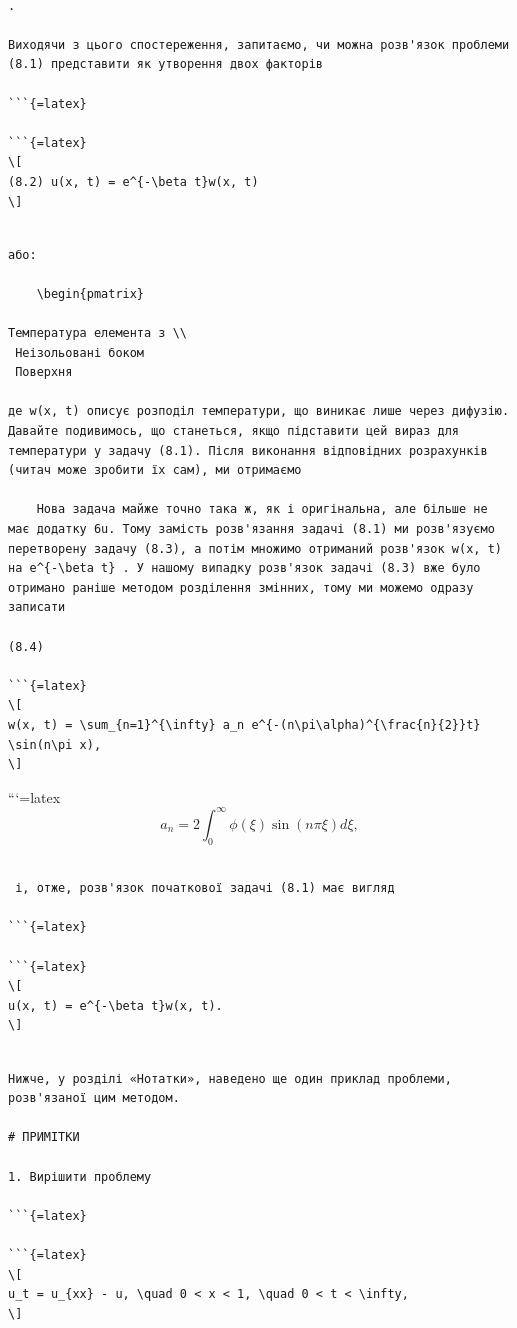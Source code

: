 \documentclass[
]{article}
\begin{document}
\begin{verbatim}

.

Виходячи з цього спостереження, запитаємо, чи можна розв'язок проблеми (8.1) представити як утворення двох факторів

```{=latex}

```{=latex}
\[
(8.2) u(x, t) = e^{-\beta t}w(x, t)
\]
\end{verbatim}

\begin{verbatim}

або:

    \begin{pmatrix}

Температура елемента з \\
 Неізольовані боком
 Поверхня

де w(x, t) описує розподіл температури, що виникає лише через дифузію. Давайте подивимось, що станеться, якщо підставити цей вираз для температури у задачу (8.1). Після виконання відповідних розрахунків (читач може зробити їх сам), ми отримаємо

    Нова задача майже точно така ж, як і оригінальна, але більше не має додатку 6u. Тому замість розв'язання задачі (8.1) ми розв'язуємо перетворену задачу (8.3), а потім множимо отриманий розв'язок w(x, t) на e^{-\beta t} . У нашому випадку розв'язок задачі (8.3) вже було отримано раніше методом розділення змінних, тому ми можемо одразу записати

(8.4)

```{=latex}
\[
w(x, t) = \sum_{n=1}^{\infty} a_n e^{-(n\pi\alpha)^{\frac{n}{2}}t} \sin(n\pi x),
\]
\end{verbatim}

```{=latex}
\[
a_n = 2 \int_0^{\infty} \phi(\xi) \sin(n\pi \xi) d\xi,
\]

\begin{verbatim}

 і, отже, розв'язок початкової задачі (8.1) має вигляд

```{=latex}

```{=latex}
\[
u(x, t) = e^{-\beta t}w(x, t).
\]
\end{verbatim}

\begin{verbatim}

Нижче, у розділі «Нотатки», наведено ще один приклад проблеми, розв'язаної цим методом.

# ПРИМІТКИ

1. Вирішити проблему

```{=latex}

```{=latex}
\[
u_t = u_{xx} - u, \quad 0 < x < 1, \quad 0 < t < \infty,
\]
\end{verbatim}
\end{document}
